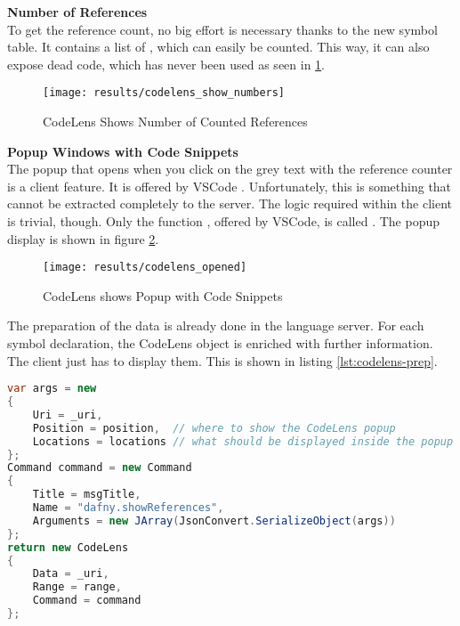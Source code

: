 \textbf{Number of References} \\
To get the reference count, no big effort is necessary thanks to the new symbol table.
It contains a list of , which can easily be counted.
This way, it can also expose dead code, which has never been used as seen in \ref{fig:codelens_show_ref_number}. \\

\begin{figure}[H]
    \centering
    \texttt{[image: results/codelens\_show\_numbers]}
    \caption{CodeLens Shows Number of Counted References}
    \label{fig:codelens_show_ref_number}
\end{figure}

\textbf{Popup Windows with Code Snippets} \\
The popup that opens when you click on the grey text
with the reference counter is a client feature.
It is offered by VSCode \cite{vscodeAPI}.
Unfortunately, this is something that cannot be extracted completely to the server.
The logic required within the client is trivial, though.
Only the function ,
offered by VSCode, is called \cite{vscodeAPI}.
The popup display is shown in figure \ref{fig:codelens_show_popup}. \\

\begin{figure}[H]
    \centering
    \texttt{[image: results/codelens\_opened]}
    \caption{CodeLens shows Popup with Code Snippets}
    \label{fig:codelens_show_popup}
\end{figure}

The preparation of the data is already done in the language server.
For each symbol declaration, the CodeLens object is enriched with further information.
The client just has to display them.
This is shown in listing \ref{lst:codelens-prep}.

\begin{lstlisting}[language=csharp, caption={LSP Handler Implementation}, captionpos=b, label={lst:codelens-prep}]
var args = new
{
    Uri = _uri,
    Position = position,  // where to show the CodeLens popup
    Locations = locations // what should be displayed inside the popup
};
Command command = new Command
{
    Title = msgTitle,
    Name = "dafny.showReferences",
    Arguments = new JArray(JsonConvert.SerializeObject(args))
};
return new CodeLens
{
    Data = _uri,
    Range = range,
    Command = command
};
\end{lstlisting}

